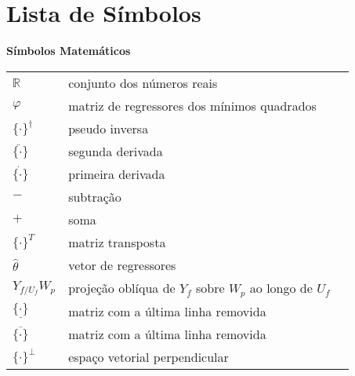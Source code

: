 
\chapter*{Lista de Símbolos}

\begin{spacing}{1.45}

\noindent \textbf{Símbolos Matemáticos}

\begin{longtable}{L{1.5cm}L{14cm}L{\textwidth}}

$\mathbb{R}$ & conjunto dos números reais & \\
$\varphi$ & matriz de regressores dos mínimos quadrados &\\
${\{ \cdot \}}^\dagger$ & pseudo inversa &\\
${\ddot{\{\cdot\}}}$ & segunda derivada &\\
${\dot{\{\cdot\}}}$ & primeira derivada &\\
$-$ & subtração & \\
$+$ & soma &\\
$\{\cdot\}^T$ & matriz transposta &\\
$\hat{\theta}$ & vetor de regressores & \\
$Y_{f/U_f}W_p$ & projeção oblíqua de $Y_f$ sobre $W_p$ ao longo de $U_f$ & \\
$\underline{\{\cdot\}}$ & matriz com a última linha removida & \\ 
$\overline{\{\cdot\}}$ & matriz com a última linha removida & \\
$\{\cdot\}^\perp$ & espaço vetorial perpendicular & \\




\end{longtable}

\end{spacing}
